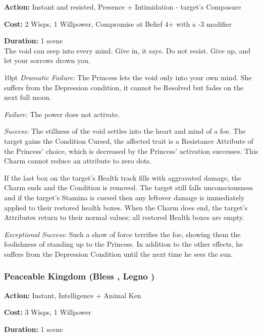 \noindent \textbf{Action:} Instant and resisted, Presence + Intimidation - target's Composure

\noindent \textbf{Cost:} 2 Wisps, 1 Willpower, Compromise at Belief 4+ with a -3 modifier

\noindent \textbf{Duration:} 1 scene \\

\noindent The void can seep into every mind. Give in, it says. Do not resist. Give up, and let your sorrows drown you.

\begin{myindentpar}{10pt}    \emph{Dramatic Failure:} The Princess lets the void only into your own mind. She suffers from the Depression condition, it cannot be Resolved but fades on the next full moon.

    \emph{Failure:} The power does not activate.

    \emph{Success:} The stillness of the void settles into the heart and mind of a foe. The target gains the Condition Cursed, the affected trait is a Resistance Attribute of the Princess' choice, which is decreased by the Princess' activation successes. This Charm cannot reduce an attribute to zero dots. 
    
    If the last box on the target's Health track fills with aggravated damage, the Charm ends and the Condition is removed. The target still falls unconsciousness and if the target's Stamina is cursed then any leftover damage is immediately applied to their restored health boxes. When the Charm does end, the target's Attributes return to their normal values; all restored Health boxes are empty.

    \emph{Exceptional Success:} Such a show of force terrifies the foe, showing them the foolishness of standing up to the Princess. In addition to the other effects, he suffers from the Depression Condition until the next time he sees the sun.\end{myindentpar}

\subsubsection*{Peaceable Kingdom (Bless \textbullet\textbullet\textbullet\textbullet\textbullet, Legno \textbullet\textbullet\textbullet\textbullet)}

\noindent \textbf{Action:} Instant, Intelligence + Animal Ken

\noindent \textbf{Cost:} 3 Wisps, 1 Willpower

\noindent \textbf{Duration:} 1 scene \\

